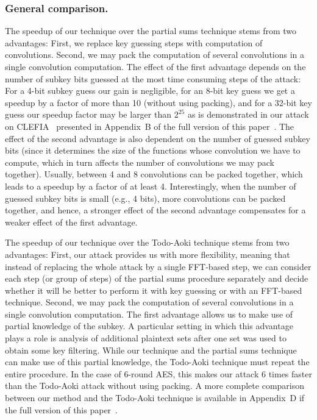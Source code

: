 \subsubsection{General comparison.} The speedup of our technique over the partial sums technique stems from two advantages: First, we replace key guessing steps with computation of convolutions. Second, we may pack the computation of several convolutions in a single convolution computation. The effect of the first advantage depends on the number of subkey bits guessed at the most time consuming steps of the attack: For a 4-bit subkey guess our gain is negligible, for an 8-bit key guess we get a speedup by a factor of more than 10 (without using packing), and for a 32-bit key guess our speedup factor may be larger than $2^{25}$ as is demonstrated in our attack on CLEFIA~\cite{CLEFIA} presented in Appendix~B of the full version of this paper~\cite{fullversion}. The effect of the second advantage is also dependent on the number of guessed subkey bits (since it determines the size of the functions whose convolution we have to compute, which in turn affects the number of convolutions we may pack together). Usually, between 4 and 8 convolutions can be packed together, which leads to a speedup by a factor of at least 4. Interestingly, when the number of guessed subkey bits is small (e.g., 4 bits), more convolutions can be packed together, and hence, a stronger effect of the second advantage compensates for a weaker effect of the first advantage. 

The speedup of our technique over the Todo-Aoki technique stems from two advantages: First, our attack provides us with more flexibility, meaning that instead of replacing the whole attack by a single FFT-based step, we can consider each step (or group of steps) of the partial sums procedure separately and decide whether it will be better to perform it with key guessing or with an FFT-based technique. Second, we may pack the computation of several convolutions in a single convolution computation. The first advantage allows us to make use of partial knowledge of the subkey. A particular setting in which this advantage plays a role is analysis of additional plaintext sets after one set was used to obtain some key filtering. While our technique and the partial sums technique can make use of this partial knowledge, the Todo-Aoki technique must repeat the entire procedure. In the case of 6-round AES, this makes our attack 6 times faster than the Todo-Aoki attack without using packing. A more complete comparison between our method and the Todo-Aoki technique is available in Appendix~D if the full version of this paper~\cite{fullversion}. 

